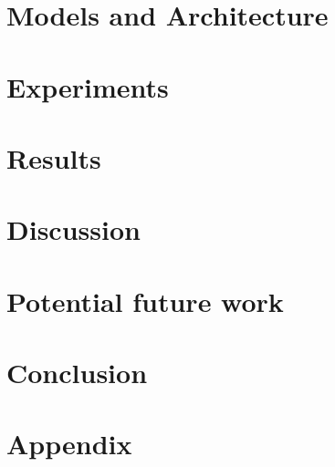 \documentclass[a4paper]{article}
\begin{document}
\section{Models and Architecture}

\section{Experiments}


\section{Results}


\section{Discussion}


\section{Potential future work}


\section{Conclusion}


{}


\newpage
\section{Appendix}

\end{document}
